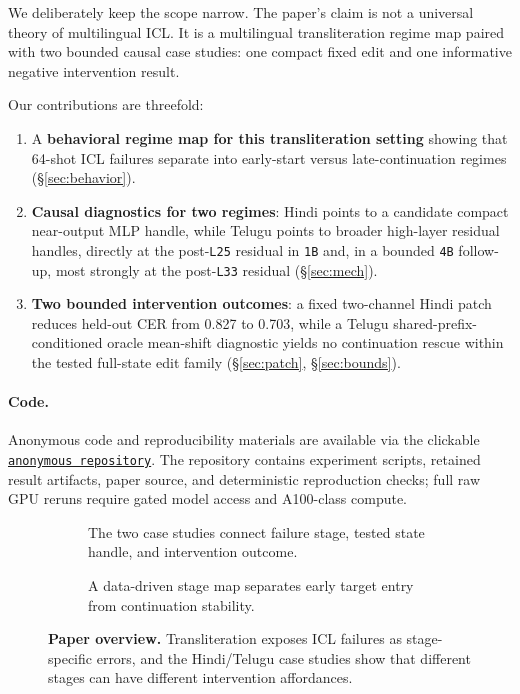 \documentclass{article}
\begin{document}
We deliberately keep the scope narrow. The paper's claim is not a universal theory of multilingual ICL. It is a multilingual transliteration regime map paired with two bounded causal case studies: one compact fixed edit and one informative negative intervention result.

Our contributions are threefold:
\begin{enumerate}
\item A \textbf{behavioral regime map for this transliteration setting} showing that 64-shot ICL failures separate into early-start versus late-continuation regimes (\S\ref{sec:behavior}).
\item \textbf{Causal diagnostics for two regimes}: Hindi points to a candidate compact near-output MLP handle, while Telugu points to broader high-layer residual handles, directly at the post-\texttt{L25} residual in \texttt{1B} and, in a bounded \texttt{4B} follow-up, most strongly at the post-\texttt{L33} residual (\S\ref{sec:mech}).
\item \textbf{Two bounded intervention outcomes}: a fixed two-channel Hindi patch reduces held-out CER from 0.827 to 0.703, while a Telugu shared-prefix-conditioned oracle mean-shift diagnostic yields no continuation rescue within the tested full-state edit family (\S\ref{sec:patch}, \S\ref{sec:bounds}).
\end{enumerate}

\paragraph{Code.} Anonymous code and reproducibility materials are
available via the clickable \href{https://anonymous.4open.science/r/early-entry-late-drift-7EBB/README.md}{\texttt{anonymous repository}}. The repository
contains experiment scripts, retained result artifacts, paper source, and
deterministic reproduction checks; full raw GPU reruns require gated model access
and A100-class compute.

\begin{figure}[t]
    \centering
    \begin{subfigure}[t]{0.48\textwidth}
        \centering
        \resizebox{\linewidth}{!}{}
        \caption{The two case studies connect failure stage, tested state handle, and intervention outcome.}
        \label{fig:stage_intervention_overview}
    \end{subfigure}\hfill
    \begin{subfigure}[t]{0.48\textwidth}
        \centering
        \resizebox{\linewidth}{!}{}
        \caption{A data-driven stage map separates early target entry from continuation stability.}
        \label{fig:axes}
    \end{subfigure}
    \caption{\textbf{Paper overview.} Transliteration exposes ICL failures as stage-specific errors, and the Hindi/Telugu case studies show that different stages can have different intervention affordances.}
    \label{fig:teaser}
\end{figure}
\end{document}

